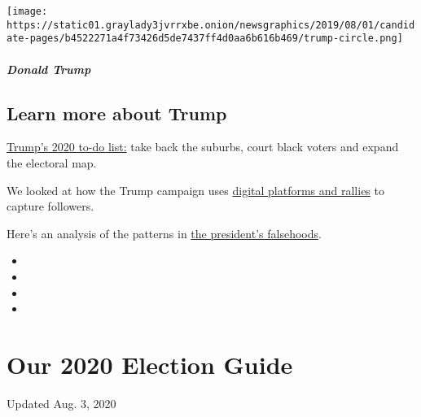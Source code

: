 \texttt{[image: https://static01.graylady3jvrrxbe.onion/newsgraphics/2019/08/01/candidate-pages/b4522271a4f73426d5de7437ff4d0aa6b616b469/trump-circle.png]}

\hypertarget{donald-trump-1}{%
\subparagraph{Donald Trump}\label{donald-trump-1}}

\hypertarget{learn-more-about-trump}{%
\subsection{Learn more about Trump}\label{learn-more-about-trump}}

\href{https://www.nytimes3xbfgragh.onion/2020/02/08/us/politics/trump-reelection-campaign.html}{Trump's
2020 to-do list:} take back the suburbs, court black voters and expand
the electoral map.

We looked at how the Trump campaign uses
\href{https://www.nytimes3xbfgragh.onion/2020/02/27/us/politics/trump-rally-campaign-data.html}{digital
platforms and rallies} to capture followers.

Here's an analysis of the patterns in
\href{https://www.nytimes3xbfgragh.onion/2018/12/29/us/politics/trump-fact-check.html}{the
president's falsehoods}.

\begin{itemize}
\item
\item
\item
\item
\end{itemize}

\hypertarget{our-2020-election-guide}{%
\section{Our 2020 Election Guide}\label{our-2020-election-guide}}

Updated Aug. 3, 2020

